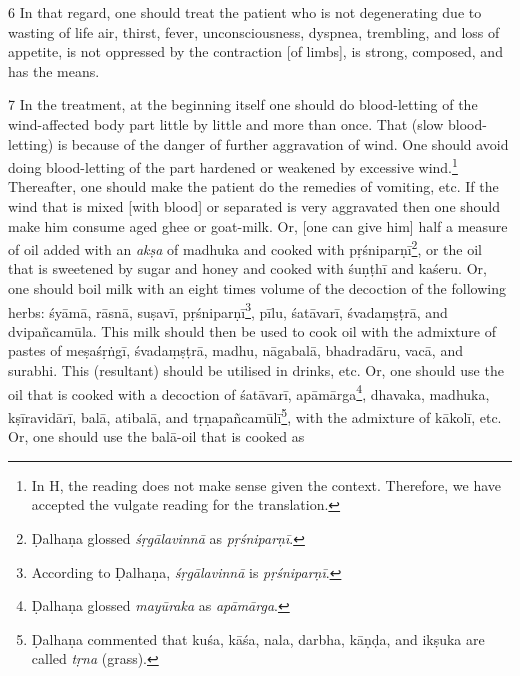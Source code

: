 \begin{translation}
    \item[6]
    In that regard, one should treat the patient who is not degenerating due to wasting of life air, thirst, fever, unconsciousness, dyspnea, trembling, and loss of appetite, is not oppressed by the contraction [of limbs], is strong, composed, and has the means.

    \item[7]
    In the treatment, at the beginning itself one should do blood-letting of the 
    wind-affected body part little by little and more than once. That (slow 
    blood-letting) is because of the danger of further aggravation of wind. One 
    should avoid doing blood-letting of the part hardened or weakened by 
    excessive wind.\footnote{In H, the reading  does not make sense 
    given the context. Therefore, we have accepted the vulgate reading 
     for the translation.} Thereafter, one should make the patient do 
    the remedies of vomiting, etc. If the wind that is mixed [with blood] or 
    separated is very aggravated then one should make him consume aged ghee 
    or goat-milk. Or, [one can give him] half a measure of oil added with an 
    \textit{akṣa} of \gls{madhuka} and cooked with 
    \gls{pṛśniparṇī}\footnote{Ḍalhaṇa glossed \citep[425]{vulgate} 
    \emph{śṛgālavinnā} as \emph{pṛśniparṇī}.}, or the oil that is sweetened by 
    sugar and honey and cooked with \gls{śuṇṭhī} and \gls{kaśeru}. Or, one 
    should boil milk with an eight times volume of the decoction of the following 
    herbs: \gls{śyāmā}, \gls{rāsnā}, \gls{suṣavī}, 
    \gls{pṛśniparṇī}\footnote{According to Ḍalhaṇa, \emph{śṛgālavinnā} is 
    \emph{pṛśniparṇī}.}, \gls{pīlu}, \gls{śatāvarī}, \gls{śvadaṃṣṭrā}, and 
    \gls{dvipañcamūla}. This milk should then be used to cook oil with the 
    admixture of pastes of \gls{meṣaśṛṅgī}, \gls{śvadaṃṣṭrā}, \gls{madhu}, 
    \gls{nāgabalā}, \gls{bhadradāru}, \gls{vacā}, and \gls{surabhi}. This 
    (resultant) should be utilised in drinks, etc. Or, one should use the oil that is 
    cooked with a decoction of \gls{śatāvarī}, \gls{apāmārga}\footnote{Ḍalhaṇa 
    glossed \citep[425]{vulgate} \textit{mayūraka} as \textit{apāmārga}.}, 
    \gls{dhavaka}, \gls{madhuka}, \gls{kṣīravidārī}, \gls{balā}, \gls{atibalā}, and 
    \gls{tṛṇapañcamūlī}\footnote{Ḍalhaṇa commented \citep[425]{vulgate} that 
    \gls{kuśa}, \gls{kāśa}, \gls{nala}, \gls{darbha}, \gls{kāṇḍa}, and \gls{ikṣuka} 
    are called \textit{tṛna} (grass).}, with the admixture of \gls{kākolī}, etc. Or, 
    one should use the \gls{balā}-oil that is cooked as 

\end{translation}
